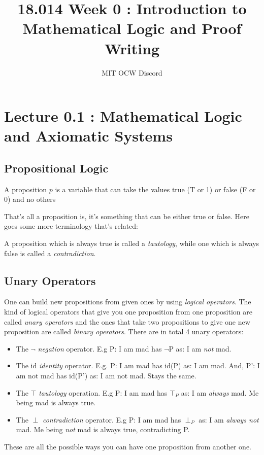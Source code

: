 \documentclass[a4paper]{article}
\title{\textbf{18.014 Week 0 : Introduction to Mathematical Logic and Proof Writing}}
\author{MIT OCW Discord}
\date{}
\begin{document}
\maketitle

\section*{Lecture 0.1 : Mathematical Logic and Axiomatic Systems}
\subsection{Propositional Logic}

\begin{definition}
A proposition $p$ is a variable that can take the values true (T or 1) or false (F or 0) and no others

\end{definition}

That's all a proposition is, it's something that can be either true or false. Here goes some more terminology that's related:

\begin{definition}
A proposition which is always true is called a \textit{tautology}, while one which is always false is called a \textit{contradiction}.
\end{definition}

\subsection{Unary Operators}
\begin{definition}
One can build new propositions from given ones by using \textit{logical operators}. The kind of logical operators that give you one proposition from one proposition are called \textit{unary operators} and the ones that take two propositions to give one new proposition are called \textit{binary operators}. There are in total 4 unary operators:
\begin{itemize}
	\item The $\neg$ \textit{negation} operator. E.g P: I am mad has $\neg$P as: I am \textit{not} mad. 
	\item The $\mathrm{id}$ \textit{identity} operator. E.g. P: I am mad has $\mathrm{id}$(P) as: I am mad. And, P': I am not mad has $\mathrm{id}$(P') as: I am not mad. Stays the same. 
	\item The $\top$ \textit{tautology} operation. E.g P: I am mad has $\top_{P}$ as: I am \textit{always} mad. Me being mad is always true. 
	\item The $\perp$ \textit{contradiction} operator. E.g P: I am mad has $\perp_{P}$ as: I am \textit{always not} mad. Me being \textit{not} mad is always true, contradicting P. 
\end{itemize}
These are all the possible ways you can have one proposition from another one.
\end{definition}
\end{document}
